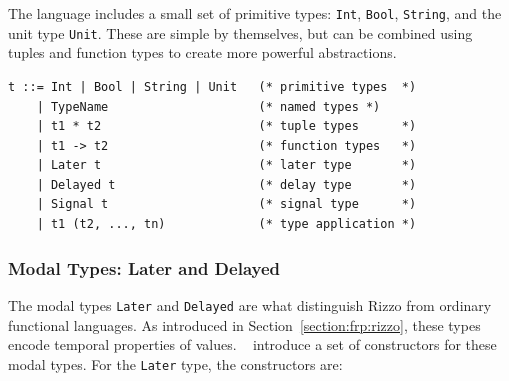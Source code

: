 The language includes a small set of primitive types: \texttt{Int}, \texttt{Bool}, \texttt{String}, and the unit type \texttt{Unit}. These are simple by themselves, but can be combined using tuples and function types to create more powerful abstractions.

\begin{verbatim}
t ::= Int | Bool | String | Unit   (* primitive types  *)
    | TypeName                     (* named types *)
    | t1 * t2                      (* tuple types      *)
    | t1 -> t2                     (* function types   *)
    | Later t                      (* later type       *)
    | Delayed t                    (* delay type       *)
    | Signal t                     (* signal type      *)
    | t1 (t2, ..., tn)             (* type application *) 
\end{verbatim}

\subsubsection{Modal Types: Later and Delayed}


The modal types \texttt{Later} and \texttt{Delayed} are what distinguish Rizzo from ordinary functional languages. As introduced in Section~\ref{section:frp:rizzo}, these types encode temporal properties of values.
\citeauthor*{rizzo_modal_2025}~\cite{rizzo_modal_2025} introduce a set of constructors for these modal types. For the \texttt{Later} type, the constructors are:

